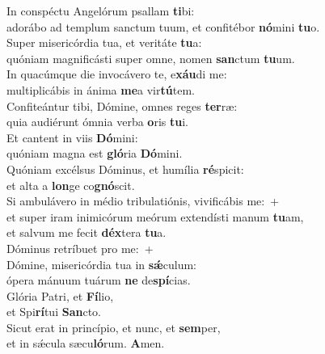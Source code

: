 \evenverse In conspéctu Angelórum psallam \textbf{ti}bi:~\*\\
\evenverse adorábo ad templum sanctum tuum, et confitébor \textbf{nó}mini \textbf{tu}o.\\
\oddverse Super misericórdia tua, et veritáte \textbf{tu}a:~\*\\
\oddverse quóniam magnificásti super omne, nomen \textbf{san}ctum \textbf{tu}um.\\
\evenverse In quacúmque die invocávero te, e\textbf{xáu}di me:~\*\\
\evenverse multiplicábis in ánima \textbf{me}a vir\textbf{tú}tem.\\
\oddverse Confiteántur tibi, Dómine, omnes reges \textbf{ter}ræ:~\*\\
\oddverse quia audiérunt ómnia verba \textbf{o}ris \textbf{tu}i.\\
\evenverse Et cantent in viis \textbf{Dó}mini:~\*\\
\evenverse quóniam magna est \textbf{gló}ria \textbf{Dó}mini.\\
\oddverse Quóniam excélsus Dóminus, et humília \textbf{ré}spicit:~\*\\
\oddverse et alta a \textbf{lon}ge co\textbf{gnó}scit.\\
\evenverse Si ambulávero in médio tribulatiónis, vivificábis me:~+\\
\evenverse  et super iram inimicórum meórum extendísti manum \textbf{tu}am,~\*\\
\evenverse et salvum me fecit \textbf{déx}tera \textbf{tu}a.\\
\oddverse Dóminus retríbuet pro me:~+\\
\oddverse  Dómine, misericórdia tua in \textbf{sǽ}culum:~\*\\
\oddverse ópera mánuum tuárum \textbf{ne} de\textbf{spí}cias.\\
\evenverse Glória Patri, et \textbf{Fí}lio,~\*\\
\evenverse et Spi\textbf{rí}tui \textbf{San}cto.\\
\oddverse Sicut erat in princípio, et nunc, et \textbf{sem}per,~\*\\
\oddverse et in sǽcula sæcu\textbf{ló}rum. \textbf{A}men.\\
